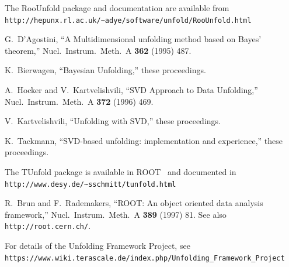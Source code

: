 \documentclass{cernrep}
\begin{document}
\begin{footnotesize}

\begin{thebibliography}{99}

  The RooUnfold package and documentation are available from\\
  \verb=http://hepunx.rl.ac.uk/~adye/software/unfold/RooUnfold.html=

  G.~D'Agostini,
  ``A Multidimensional unfolding method based on Bayes' theorem,''
  Nucl.\ Instrum.\ Meth.\  A {\bf 362} (1995) 487.

  K.~Bierwagen,
  ``Bayesian Unfolding,''
  these proceedings.

  A.~Hocker and V.~Kartvelishvili,
  ``SVD Approach to Data Unfolding,''
  Nucl.\ Instrum.\ Meth.\  A {\bf 372} (1996) 469.

  V.~Kartvelishvili,
  ``Unfolding with SVD,''
  these proceedings.

  K.~Tackmann,
  ``SVD-based unfolding: implementation and experience,''
  these proceedings.

  The TUnfold package is available in ROOT~\cite{Brun:1997pa} and documented in
  \verb=http://www.desy.de/~sschmitt/tunfold.html=

  R.~Brun and F.~Rademakers,
  ``ROOT: An object oriented data analysis framework,''
  Nucl.\ Instrum.\ Meth.\  A {\bf 389} (1997) 81.
  See also \verb=http://root.cern.ch/=.

  For details of the Unfolding Framework Project, see\\
  \verb=https://www.wiki.terascale.de/index.php/Unfolding_Framework_Project=

\end{thebibliography}

\end{footnotesize}

\end{document}
